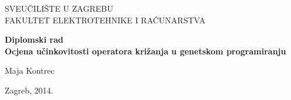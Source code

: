 \begin{titlepage}

\begin{center}
	
	{\large SVEUČILIŠTE U ZAGREBU\\FAKULTET ELEKTROTEHNIKE I RAČUNARSTVA}
	
	\vfill

	\textbf{ \large Diplomski rad} \\


	\vspace{20pt}
	\textbf{\huge Ocjena učinkovitosti operatora križanja u genetskom programiranju}
	\vspace{40pt}
	
	\bigskip
	
	\begin{minipage}{1.0\textwidth}
	\begin{center} 
	Maja Kontrec
	\end{center}
	\end{minipage}
	\vfill

	{\large Zagreb, 2014.}
	
\end{center}

\end{titlepage}